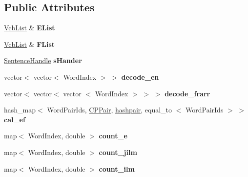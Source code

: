 \subsection*{\-Public \-Attributes}
\begin{DoxyCompactItemize}
\item 
\hypertarget{classmodel12_a6b9cc7cb012ce746605474920745c891}{\hyperlink{classVcbList}{\-Vcb\-List} \& {\bfseries \-E\-List}}\label{classmodel12_a6b9cc7cb012ce746605474920745c891}

\item 
\hypertarget{classmodel12_a24cc85f8105c88930d3541fe6889362b}{\hyperlink{classVcbList}{\-Vcb\-List} \& {\bfseries \-F\-List}}\label{classmodel12_a24cc85f8105c88930d3541fe6889362b}

\item 
\hypertarget{classmodel12_a3aef8d55849ae242bcb4eeaee3acbd63}{\hyperlink{classSentenceHandle}{\-Sentence\-Handle} {\bfseries s\-Hander}}\label{classmodel12_a3aef8d55849ae242bcb4eeaee3acbd63}

\item 
\hypertarget{classmodel12_aac62d5e800c6840cb44b642987abc5da}{vector$<$ vector$<$ \-Word\-Index $>$ $>$ {\bfseries decode\-\_\-en}}\label{classmodel12_aac62d5e800c6840cb44b642987abc5da}

\item 
\hypertarget{classmodel12_a233efc519d74a0e486067afd7aae5c51}{vector$<$ vector$<$ vector\*
$<$ \-Word\-Index $>$ $>$ $>$ {\bfseries decode\-\_\-frarr}}\label{classmodel12_a233efc519d74a0e486067afd7aae5c51}

\item 
\hypertarget{classmodel12_a0d8f60f82ca2d817bc10a9c3fac9af63}{hash\-\_\-map$<$ \-Word\-Pair\-Ids, \hyperlink{classCPPair}{\-C\-P\-Pair}, \*
\hyperlink{classhashpair}{hashpair}, equal\-\_\-to\*
$<$ \-Word\-Pair\-Ids $>$ $>$ {\bfseries cal\-\_\-ef}}\label{classmodel12_a0d8f60f82ca2d817bc10a9c3fac9af63}

\item 
\hypertarget{classmodel12_a2a9b944c3f4375ad6828d9bcd28e6bbd}{map$<$ \-Word\-Index, double $>$ {\bfseries count\-\_\-e}}\label{classmodel12_a2a9b944c3f4375ad6828d9bcd28e6bbd}

\item 
\hypertarget{classmodel12_a8aeff025d4a049f5bed9aaa6b37a4f44}{map$<$ \-Word\-Index, double $>$ {\bfseries count\-\_\-jilm}}\label{classmodel12_a8aeff025d4a049f5bed9aaa6b37a4f44}

\item 
\hypertarget{classmodel12_a8751de57c213fe6475913a911aa63d39}{map$<$ \-Word\-Index, double $>$ {\bfseries count\-\_\-ilm}}\label{classmodel12_a8751de57c213fe6475913a911aa63d39}


\end{DoxyCompactItemize}
